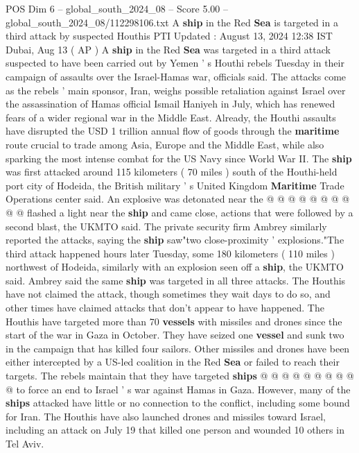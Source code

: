 \begin{textsample}{POS Dim 6 – global\_south\_2024\_08 – Score 5.00 – global\_south\_2024\_08/112298106.txt}  \label{ex:f6_pos_390}
A \textbf{ship} in the Red \textbf{Sea} is targeted in a third attack by suspected Houthis PTI Updated : August 13, 2024 12:38 IST Dubai, Aug 13 ( AP ) A \textbf{ship} in the Red \textbf{Sea} was targeted in a third attack suspected to have been carried out by Yemen ' s Houthi rebels Tuesday in their campaign of assaults over the Israel-Hamas war, officials said.
The attacks come as the rebels ' main sponsor, Iran, weighs possible retaliation against Israel over the assassination of Hamas official Ismail Haniyeh in July, which has renewed fears of a wider regional war in the Middle East.
Already, the Houthi assaults have disrupted the USD 1 trillion annual flow of goods through the \textbf{maritime} route crucial to trade among Asia, Europe and the Middle East, while also sparking the most intense combat for the US Navy since World War II.
The \textbf{ship} was first attacked around 115 kilometers ( 70 miles ) south of the Houthi-held port city of Hodeida, the British military ' s United Kingdom \textbf{Maritime} Trade Operations center said.
An explosive was detonated near the @ @ @ @ @ @ @ @ @ @ flashed a light near the \textbf{ship} and came close, actions that were followed by a second blast, the UKMTO said.
The private security firm Ambrey similarly reported the attacks, saying the \textbf{ship} saw"two close-proximity ' explosions."The third attack happened hours later Tuesday, some 180 kilometers ( 110 miles ) northwest of Hodeida, similarly with an explosion seen off a \textbf{ship}, the UKMTO said.
Ambrey said the same \textbf{ship} was targeted in all three attacks.
The Houthis have not claimed the attack, though sometimes they wait days to do so, and other times have claimed attacks that don't appear to have happened.
The Houthis have targeted more than 70 \textbf{vessels} with missiles and drones since the start of the war in Gaza in October.
They have seized one \textbf{vessel} and sunk two in the campaign that has killed four sailors.
Other missiles and drones have been either intercepted by a US-led coalition in the Red \textbf{Sea} or failed to reach their targets.
The rebels maintain that they have targeted \textbf{ships} @ @ @ @ @ @ @ @ @ @ to force an end to Israel ' s war against Hamas in Gaza.
However, many of the \textbf{ships} attacked have little or no connection to the conflict, including some bound for Iran.
The Houthis have also launched drones and missiles toward Israel, including an attack on July 19 that killed one person and wounded 10 others in Tel Aviv.

\end{textsample}
